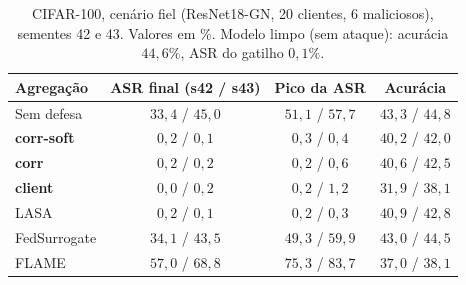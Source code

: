 \begin{table}[t]\centering\small
\caption{CIFAR-100, cenário fiel (ResNet18-GN, 20 clientes, 6 maliciosos), sementes 42 e 43. Valores
em \%. Modelo limpo (sem ataque): acurácia $44{,}6\%$, ASR do gatilho $0{,}1\%$.}
\label{tab:c100}
\begin{tabular}{lccc}
\toprule
Agregação & ASR final (s42 / s43) & Pico da ASR & Acurácia \\
\midrule
Sem defesa & $33{,}4$ / $45{,}0$ & $51{,}1$ / $57{,}7$ & $43{,}3$ / $44{,}8$ \\
\textbf{corr-soft} & $0{,}2$ / $0{,}1$ & $0{,}3$ / $0{,}4$ & $40{,}2$ / $42{,}0$ \\
\textbf{corr} & $0{,}2$ / $0{,}2$ & $0{,}2$ / $0{,}6$ & $40{,}6$ / $42{,}5$ \\
\textbf{client} & $0{,}0$ / $0{,}2$ & $0{,}2$ / $1{,}2$ & $31{,}9$ / $38{,}1$ \\
LASA & $0{,}2$ / $0{,}1$ & $0{,}2$ / $0{,}3$ & $40{,}9$ / $42{,}8$ \\
FedSurrogate & $34{,}1$ / $43{,}5$ & $49{,}3$ / $59{,}9$ & $43{,}0$ / $44{,}5$ \\
FLAME & $57{,}0$ / $68{,}8$ & $75{,}3$ / $83{,}7$ & $37{,}0$ / $38{,}1$ \\
\bottomrule
\end{tabular}
\end{table}
